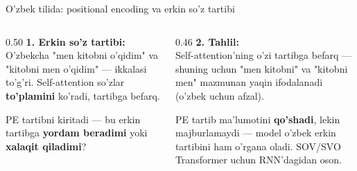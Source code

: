 \documentclass[aspectratio=169,11pt]{beamer}
\begin{document}
\begin{frame}{O'zbek tilida: positional encoding va erkin so'z tartibi}
  \begin{columns}[T]
    \begin{column}{0.50\textwidth}
      \textbf{1. Erkin so'z tartibi:}\\[3pt]
      \small
      O'zbekcha "men kitobni o'qidim" va "kitobni men o'qidim" --- ikkalasi
      to'g'ri. Self-attention so'zlar \textbf{to'plamini} ko'radi, tartibga
      befarq.
      \begin{tcolorbox}[warnbox,title=Savol,top=2pt,bottom=2pt]
        \footnotesize
        PE tartibni kiritadi --- bu erkin tartibga \textbf{yordam beradimi}
        yoki \textbf{xalaqit qiladimi}?
      \end{tcolorbox}
    \end{column}
    \begin{column}{0.46\textwidth}
      \textbf{2. Tahlil:}\\[3pt]
      \small
      Self-attention'ning o'zi tartibga befarq --- shuning uchun "men kitobni"
      va "kitobni men" mazmunan yaqin ifodalanadi (o'zbek uchun afzal).
      \begin{tcolorbox}[okbox,top=2pt,bottom=2pt]
        \footnotesize
        PE tartib ma'lumotini \textbf{qo'shadi}, lekin majburlamaydi --- model
        o'zbek erkin tartibini ham o'rgana oladi. SOV/SVO Transformer uchun
        RNN'dagidan oson.
      \end{tcolorbox}
    \end{column}
  \end{columns}
\end{frame}
\end{document}
